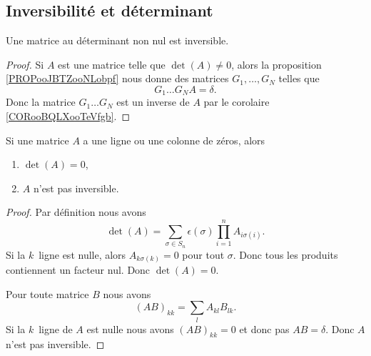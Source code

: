 \subsection{Inversibilité et déterminant}

\begin{proposition}     \label{PROPooAVIXooMtVCet}
	Une matrice au déterminant non nul est inversible.
\end{proposition}

\begin{proof}
	Si \( A\) est une matrice telle que \( \det(A)\neq 0\), alors la proposition \ref{PROPooJBTZooNLobpf} nous donne des matrices \( G_1,\ldots, G_N\) telles que
	\begin{equation}
		G_1\ldots G_NA=\delta.
	\end{equation}
	Donc la matrice \( G_1\ldots G_N\) est un inverse de \( A\) par le corolaire \ref{CORooBQLXooTeVfgb}.
\end{proof}

\begin{proposition}     \label{PROPooEOKBooKUROFg}
	Si une matrice \( A\) a une ligne ou une colonne de zéros, alors
	\begin{enumerate}
		\item
		      \( \det(A)=0\),
		\item
		      \( A\) n'est pas inversible.
	\end{enumerate}
\end{proposition}

\begin{proof}
	Par définition nous avons
	\begin{equation}
		\det(A)=\sum_{\sigma\in S_n}\epsilon(\sigma)\prod_{i=1}^nA_{i\sigma(i)}.
	\end{equation}
	Si la \( k\)\ieme\ ligne est nulle, alors \( A_{k\sigma(k)}=0\) pour tout \( \sigma\). Donc tous les produits contiennent un facteur nul. Donc \( \det(A)=0\).

	Pour toute matrice \( B\) nous avons
	\begin{equation}
		(AB)_{kk}=\sum_lA_{kl}B_{lk}.
	\end{equation}
	Si la \( k\)\ieme\ ligne de \( A\) est nulle nous avons \( (AB)_{kk}=0\) et donc pas \( AB=\delta\). Donc \( A\) n'est pas inversible.
\end{proof}


